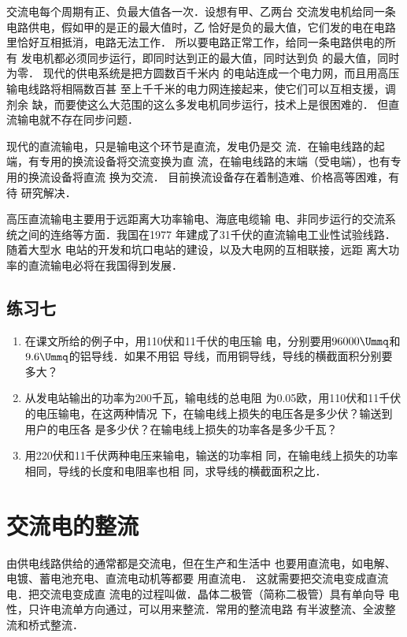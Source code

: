 交流电每个周期有正、负最大值各一次．设想有甲、乙两台
交流发电机给同一条电路供电，假如甲的是正的最大值时，乙
恰好是负的最大值，它们发的电在电路里恰好互相抵消，电路无法工作．
所以要电路正常工作，给同一条电路供电的所有
发电机都必须同步运行，即同时达到正的最大值，同时达到负
的最大值，同时为零．
现代的供电系统是把方圆数百千米内
的电站连成一个电力网，而且用高压输电线路将相隔数百甚
至上千千米的电力网连接起来，使它们可以互相支援，调剂余
缺，而要使这么大范围的这么多发电机同步运行，技术上是很困难的．
但直流输电就不存在同步问题．

现代的直流输电，只是输电这个环节是直流，发电仍是交
流．在输电线路的起端，有专用的换流设备将交流变换为直
流，在输电线路的末端（受电端），也有专用的换流设备将直流
换为交流．
目前换流设备存在着制造难、价格高等困难，有待
研究解决．

高压直流输电主要用于远距离大功率输电、海底电缆输
电、非同步运行的交流系统之间的连络等方面．我国在1977
年建成了31千伏的直流输电工业性试验线路．随着大型水
电站的开发和坑口电站的建设，以及大电网的互相联接，远距
离大功率的直流输电必将在我国得到发展．

\subsection*{练习七}
\begin{enumerate}
    \item 在课文所给的例子中，用110伏和11千伏的电压输
电，分别要用$96000\Ummq $和$9.6\Ummq $的铝导线．如果不用铝
导线，而用铜导线，导线的横截面积分别要多大？
\item 从发电站输出的功率为200千瓦，输电线的总电阻
为0.05欧，用110伏和11千伏的电压输电，在这两种情况
下，在输电线上损失的电压各是多少伏？输送到用户的电压各
是多少伏？在输电线上损失的功率各是多少千瓦？
\item 用220伏和11千伏两种电压来输电，输送的功率相
同，在输电线上损失的功率相同，导线的长度和电阻率也相
同，求导线的横截面积之比．
\end{enumerate}

\section{交流电的整流}
由供电线路供给的通常都是交流电，但在生产和生活中
也要用直流电，如电解、电镀、蓄电池充电、直流电动机等都要
用直流电．
这就需要把交流电变成直流电．把交流电变成直
流电的过程叫做．晶体二极管（简称二极管）具有单向导
电性，只许电流单方向通过，可以用来整流．常用的整流电路
有半波整流、全波整流和桥式整流．

